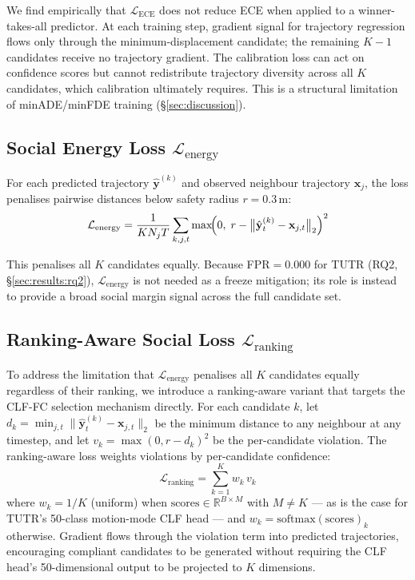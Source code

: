 \documentclass{article}
\begin{document}
We find empirically that \(\mathcal{L}_{\text{ECE}}\) does not reduce ECE
when applied to a winner-takes-all predictor. At each training step, gradient
signal for trajectory regression flows only through the minimum-displacement
candidate; the remaining \(K-1\) candidates receive no trajectory gradient.
The calibration loss can act on confidence scores but cannot redistribute
trajectory diversity across all \(K\) candidates, which calibration ultimately
requires. This is a structural limitation of minADE/minFDE training
(\S\ref{sec:discussion}).

\subsection{Social Energy Loss \(\mathcal{L}_{\text{energy}}\)}
\label{sec:method:energy}

For each predicted trajectory \(\hat{\mathbf{y}}^{(k)}\) and observed
neighbour trajectory \(\mathbf{x}_j\), the loss penalises pairwise distances
below safety radius \(r=0.3\)\,m:
%
\begin{equation}
  \mathcal{L}_{\text{energy}} = \frac{1}{KN_j T}
  \sum_{k,j,t} \max\!\Bigl(0,\;
  r - \bigl\|\hat{\mathbf{y}}^{(k)}_t - \mathbf{x}_{j,t}\bigr\|_2\Bigr)^2
  \label{eq:lenergy}
\end{equation}

This penalises all \(K\) candidates equally. Because FPR\(=0.000\) for TUTR
(RQ2, \S\ref{sec:results:rq2}), \(\mathcal{L}_{\text{energy}}\) is not needed
as a freeze mitigation; its role is instead to provide a broad social margin
signal across the full candidate set.

\subsection{Ranking-Aware Social Loss \(\mathcal{L}_{\text{ranking}}\)}
\label{sec:method:ranking}

To address the limitation that \(\mathcal{L}_{\text{energy}}\) penalises all
$K$ candidates equally regardless of their ranking, we introduce a
ranking-aware variant that targets the CLF-FC selection mechanism directly.
For each candidate \(k\), let \(d_k = \min_{j,t}\|\hat{\mathbf{y}}^{(k)}_t -
\mathbf{x}_{j,t}\|_2\) be the minimum distance to any neighbour at any
timestep, and let \(v_k = \max(0, r - d_k)^2\) be the per-candidate violation.
The ranking-aware loss weights violations by per-candidate confidence:
%
\begin{equation}
  \mathcal{L}_{\text{ranking}} = \sum_{k=1}^{K} w_k \, v_k
  \label{eq:lranking}
\end{equation}
%
where \(w_k = 1/K\) (uniform) when \(\text{scores} \in \mathbb{R}^{B \times
M}\) with \(M \neq K\) --- as is the case for TUTR's 50-class motion-mode
CLF head --- and \(w_k = \text{softmax}(\text{scores})_k\) otherwise.
Gradient flows through the violation term into predicted trajectories,
encouraging compliant candidates to be generated without requiring the CLF
head's 50-dimensional output to be projected to $K$ dimensions.
\end{document}
